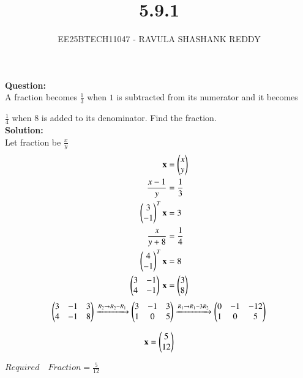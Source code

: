 \documentclass[journal]{article}
\begin{document}
	
	
	\vspace{3cm}
	
\title{5.9.1}
\author{EE25BTECH11047 - RAVULA SHASHANK REDDY}
\maketitle
\hrulefill
\bigskip 

\renewcommand{\thetable}{\theenumi}
\setlength{\intextsep}{10pt}

\textbf{Question:} \\

A fraction becomes $\tfrac{1}{3}$ when $1$ is subtracted from its numerator and it becomes 

$\tfrac{1}{4}$ when $8$ is added to its denominator. Find the fraction.\\

 \textbf{Solution:}\\
 
Let fraction be  $\tfrac{x}{y}$  
\begin{align}
\mathbf{x}&=\begin{pmatrix}x \\ y\end{pmatrix}\\
\frac{x-1}{y}&=\frac{1}{3}\\
\begin{pmatrix}3 \\ -1\end{pmatrix}^T\mathbf{x}&=3\\
\frac{x}{y+8}&=\frac{1}{4}\\
\begin{pmatrix}4 \\ -1\end{pmatrix}^T\mathbf{x}&=8\\
\begin{pmatrix}3 & -1 \\ 4 & -1\end{pmatrix}\,\mathbf{x} &= \begin{pmatrix}3 \\ 8\end{pmatrix}
\end{align}
\begin{align}
\begin{pmatrix}3 & -1 & 3 \\ 4 & -1 & 8\end{pmatrix}
\xrightarrow{R_2 \rightarrow{R_2-R_1}}
\begin{pmatrix}3 & -1 & 3 \\ 1 & 0 & 5\end{pmatrix}
\xrightarrow{R_1\rightarrow{R_1-3R_2}}
\begin{pmatrix}0 & -1 & -12 \\ 1 & 0 & 5\end{pmatrix}
\end{align}

\begin{align}
\mathbf{x}=\begin{pmatrix}5 \\ 12\end{pmatrix}
\end{align}
\begin{center}

$\boxed{Required\quad Fraction = \frac{5}{12}}$
\end{center}
\end{document}
